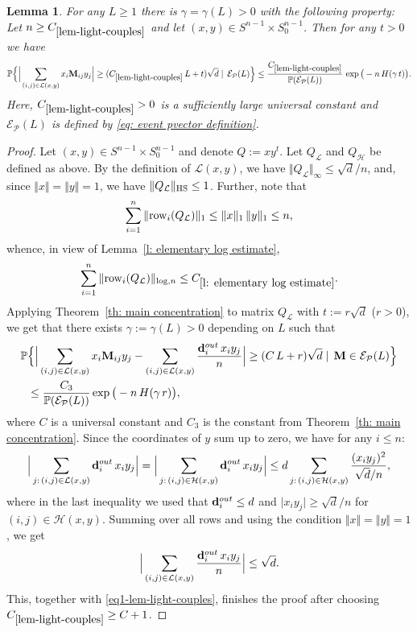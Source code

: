 \documentclass[12pt]{article}
\newtheorem{lemma}[theorem]{Lemma}
\theoremstyle{definition}
\theoremstyle{plain}
\newcommand{\Event}{\mathcal{E}}
\def\ranmtx{{\bf{}M}}
\def\Prob{{\mathbb P}}
\def\OutDeg{{\bf d}^{out}}
\def\Row{{\rm row}}
\def\pvector{{\mathcal P}}
\begin{document}
\begin{lemma}\label{lem-light-couples}
For any $L\geq 1$ there is $\gamma=\gamma(L)>0$ with the following property:
Let $n\geq C_{\ref{lem-light-couples}}$ and let $(x,y)\in S^{n-1}\times S_0^{n-1}$. Then for any $t>0$ we have  
$$
\Prob\Big\{\Big\vert \sum_{(i,j)\in \mathcal{L}(x,y)} x_i\ranmtx_{ij}y_j\Big\vert
\geq (C_{\ref{lem-light-couples}}\, L+t)\sqrt{d}\mid\, \Event_{\pvector}(L)\Big\}
\leq \frac{C_{\ref{lem-light-couples}}}{\Prob(\Event_\pvector(L))}\,  \exp\big(-n\, H(\gamma\, t)\big).
$$
Here, $C_{\ref{lem-light-couples}}>0$ is a sufficiently large universal constant
and $\Event_\pvector(L)$ is defined by \eqref{eq: event pvector definition}.
\end{lemma}
\begin{proof}
Let $(x,y)\in S^{n-1}\times S_0^{n-1}$ and denote $Q:= xy^t$. Let $Q_{\mathcal L}$ and $Q_{\mathcal H}$
be defined as above.
By the definition of $\mathcal{L}(x,y)$, we have $\Vert Q_{\mathcal{L}}\Vert_\infty\leq \sqrt{d}/n$, and,
since $\Vert x\Vert=\Vert y\Vert=1$, we have
$\Vert Q_{\mathcal{L}}\Vert_{\rm HS}\leq 1$. 
Further, note that 
$$
\sum_{i=1}^n \Vert \Row_i(Q_{\mathcal{L}})\Vert_1 
\leq \Vert x\Vert_1\, \Vert y\Vert_1\leq n,
$$
whence, in view of Lemma~\ref{l: elementary log estimate},
$$
\sum_{i=1}^n\|\Row_i(Q_{\mathcal{L}})\|_{\log,n}\leq C_{\ref{l: elementary log estimate}}.
$$
Applying Theorem~\ref{th: main concentration}
to matrix $Q_{\mathcal{L}}$ with $t:=r \sqrt{d}$ ($r>0$), we get that
there exists $\gamma:=\gamma(L)>0$ depending on $L$ such that 
\begin{align}\nonumber
\Prob&\Big\{\Big\vert \sum_{(i,j)\in \mathcal{L}(x,y)} x_i\ranmtx_{ij}y_j-\sum_{(i,j)\in \mathcal{L}(x,y)} \frac{\OutDeg_i\, x_iy_j}{n}\Big\vert 
\geq (C\, L+r)\sqrt{d}\mid\, \ranmtx\in\Event_{\pvector}(L)\Big\}\\\label{eq1-lem-light-couples}
&\leq \frac{C_3}{\Prob(\Event_\pvector(L))} \exp\big(-n\, H(\gamma\, r)\big),
\end{align}
where $C$ is a universal constant and $C_3$ is the constant from Theorem~\ref{th: main concentration}.
Since the coordinates of $y$ sum up to zero, we have for any $i\leq n$: 
$$
\Big\vert \sum_{j:\, (i,j)\in \mathcal{L}(x,y)} \OutDeg_i\, x_{i}y_j\Big\vert
=\Big\vert \sum_{j:\, (i,j)\in \mathcal{H}(x,y)} \OutDeg_i\, x_{i}y_j\Big\vert
\leq d\sum_{j:\, (i,j)\in \mathcal{H}(x,y)} \frac{(x_iy_j)^2}{\sqrt{d}/n},
$$
where in the last inequality we used that $\OutDeg_i\leq d$ and $\vert x_{i}y_j\vert\geq \sqrt{d}/n$ for $(i,j)\in  \mathcal{H}(x,y)$. 
Summing over all rows and using the condition $\Vert x\Vert=\Vert y\Vert=1$, we get 
$$
\Big|\sum_{(i,j)\in \mathcal{L}(x,y)} \frac{\OutDeg_i\, x_iy_j}{n}\Big|\leq \sqrt{d}.
$$
This, together with  \eqref{eq1-lem-light-couples}, finishes the proof after choosing $C_{\ref{lem-light-couples}}\geq C+1$.
\end{proof}
\end{document}
